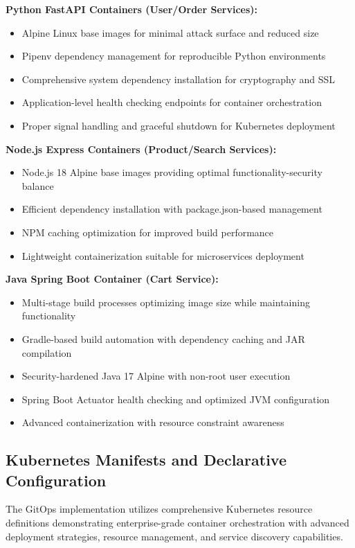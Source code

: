 \textbf{Python FastAPI Containers (User/Order Services):}
\begin{itemize}
\item Alpine Linux base images for minimal attack surface and reduced size
\item Pipenv dependency management for reproducible Python environments
\item Comprehensive system dependency installation for cryptography and SSL
\item Application-level health checking endpoints for container orchestration
\item Proper signal handling and graceful shutdown for Kubernetes deployment
\end{itemize}

\textbf{Node.js Express Containers (Product/Search Services):}
\begin{itemize}
\item Node.js 18 Alpine base images providing optimal functionality-security balance
\item Efficient dependency installation with package.json-based management
\item NPM caching optimization for improved build performance
\item Lightweight containerization suitable for microservices deployment
\end{itemize}

\textbf{Java Spring Boot Container (Cart Service):}
\begin{itemize}
\item Multi-stage build processes optimizing image size while maintaining functionality
\item Gradle-based build automation with dependency caching and JAR compilation
\item Security-hardened Java 17 Alpine with non-root user execution
\item Spring Boot Actuator health checking and optimized JVM configuration
\item Advanced containerization with resource constraint awareness
\end{itemize}

\subsection{Kubernetes Manifests and Declarative Configuration}

The GitOps implementation utilizes comprehensive Kubernetes resource definitions demonstrating enterprise-grade container orchestration with advanced deployment strategies, resource management, and service discovery capabilities.

